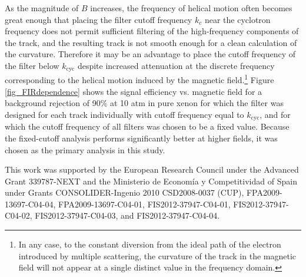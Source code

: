 \documentclass{JINST}
\begin{document}
As the magnitude of $B$ increases, the frequency of helical motion often becomes great enough that placing the 
filter cutoff frequency $k_{c}$ near the cyclotron frequency does not permit sufficient filtering of the 
high-frequency components of the track, and the resulting track is not smooth enough for a clean calculation of 
the curvature.  Therefore it may be an advantage to place the cutoff frequency of the filter below 
$k_{\mathrm{cyc}}$ despite increased attenuation at the discrete frequency corresponding to the helical motion 
induced by the magnetic field.\footnote{In any case, to the constant diversion from the ideal path of the electron
introduced by multiple scattering, the curvature of the track in the magnetic field will not appear at a single 
distinct value in the frequency domain.}  Figure \ref{fig_FIRdependence} shows the signal efficiency vs. magnetic
field for a background rejection of 90\% at 10 atm in pure xenon for which the filter was designed for each track 
individually with cutoff frequency equal to $k_{\mathrm{cyc}}$, and for which the cutoff frequency of all filters 
was chosen to be a fixed value.  
Because the fixed-cutoff analysis performs significantly better at higher fields, it was chosen as the primary 
analysis in this study.




\acknowledgments

This work was supported by the European Research Council under the Advanced Grant 339787-NEXT and the Ministerio de Econom\'{i}a y Competitividad of Spain under Grants CONSOLIDER-Ingenio 2010 CSD2008-0037 (CUP), FPA2009-13697-C04-04, FPA2009-13697-C04-01, FIS2012-37947-C04-01, FIS2012-37947-C04-02, FIS2012-37947-C04-03, and FIS2012-37947-C04-04.


\end{document}
